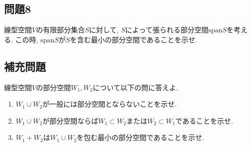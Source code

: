 \documentclass[a4j,dvipdfmx]{jsarticle}
\begin{document}
    \subsection*{問題8}
        線型空間$V$の有限部分集合$S$に対して, $S$によって張られる部分空間$\mathrm{span}S$を考える. 
        この時, $\mathrm{span}S$が$S$を含む最小の部分空間であることを示せ.
    \clearpage
    \subsection*{補充問題}
        線型空間$V$の部分空間$W_1,W_2$について以下の問に答えよ.
        \begin{enumerate}
            \item $W_1\cup W_2$が一般には部分空間とならないことを示せ.
            \item $W_1\cup W_2$が部分空間ならば$W_1\subset W_2$または$W_2\subset W_1$であることを示せ.
            \item $W_1+W_2$は$W_1\cup W_2$を包む最小の部分空間であることを示せ.
        \end{enumerate}
\end{document}
